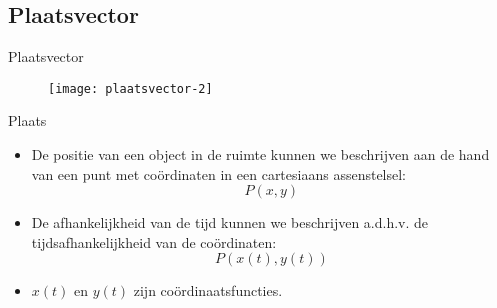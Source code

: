 


\subsection{Plaatsvector}

\begin{frame}{Plaatsvector}
\begin{figure}
\texttt{[image: plaatsvector-2]}
\end{figure}
\end{frame}

\begin{frame}{Plaats}
\begin{itemize}
\item<1-> De positie van een object in de ruimte kunnen we beschrijven aan de hand van een punt met co\"ordinaten in een cartesiaans assenstelsel:
\begin{displaymath}
P(x,y)	
\end{displaymath}
\item<2-> De afhankelijkheid van de tijd kunnen we beschrijven a.d.h.v. de tijdsafhankelijkheid van de co\"ordinaten:
\begin{displaymath}
	P(x(t),y(t))
\end{displaymath}
\item<3-> $x(t)$ en $y(t)$ zijn co\"ordinaatsfuncties.
\end{itemize}
\end{frame}





